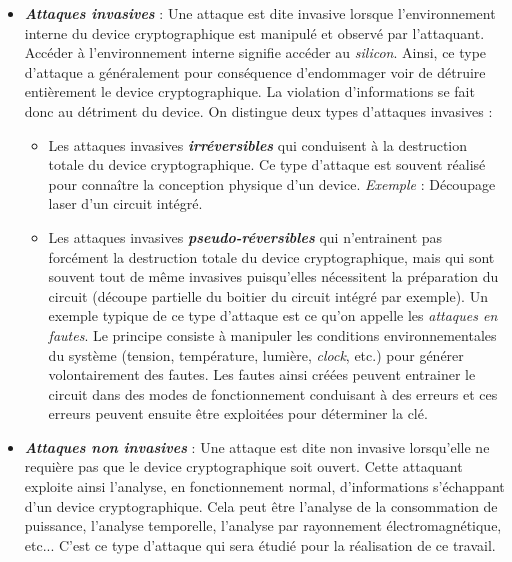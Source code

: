 \documentclass[oneside]{book}
\begin{document}
\begin{itemize}
\item \textbf{\textit{Attaques invasives}} : Une attaque est dite invasive lorsque l'environnement interne du device cryptographique est manipulé et observé par l'attaquant. Accéder à l'environnement interne signifie accéder au \textit{silicon}. Ainsi, ce type d'attaque a généralement pour conséquence d'endommager voir de détruire entièrement le device cryptographique. La violation d'informations se fait donc au détriment du device. On distingue deux types d'attaques invasives : 
\begin{itemize}
\item Les attaques invasives \textbf{\textit{irréversibles}} qui conduisent à la destruction totale du device cryptographique. Ce type d'attaque est souvent réalisé pour connaître la conception physique d'un device. \textit{Exemple} : Découpage laser d’un circuit intégré.
\item Les attaques invasives \textbf{\textit{pseudo-réversibles}} qui n’entrainent pas forcément la destruction totale du device cryptographique, mais qui sont souvent tout de même invasives puisqu’elles nécessitent la préparation du circuit (découpe partielle du boitier du circuit intégré par exemple). Un exemple typique de ce type d'attaque est ce qu'on appelle les \textit{attaques en fautes}. Le principe consiste à manipuler les conditions environnementales du système (tension, température, lumière, \textit{clock}, etc.) pour générer volontairement des fautes. Les fautes ainsi créées peuvent entrainer le circuit dans des modes de fonctionnement conduisant à des erreurs et ces erreurs peuvent ensuite être exploitées pour déterminer la clé.
\end{itemize}
\item \textbf{\textit{Attaques non invasives}} : Une attaque est dite non invasive lorsqu'elle ne requière pas que le device cryptographique soit ouvert. Cette attaquant exploite ainsi l'analyse, en fonctionnement normal, d'informations s'échappant d'un device cryptographique. Cela peut être l'analyse de la consommation de puissance, l'analyse temporelle, l'analyse par rayonnement électromagnétique, etc... C'est ce type d'attaque qui sera étudié pour la réalisation de ce travail. \\
\end{itemize}
\end{document}
